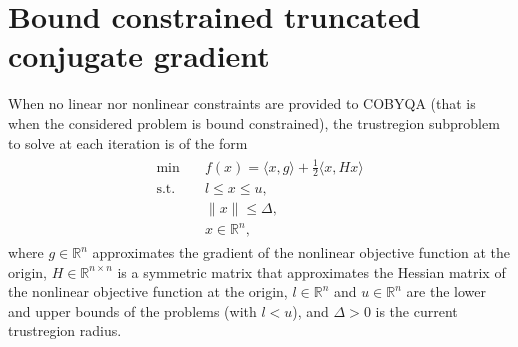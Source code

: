 \documentclass[letterpaper,10pt,english]{sphinxmanual}
\newcommand{\norm}[2][]{#1\lVert#2#1\rVert}
\newcommand{\inner}[2][]{#1\langle#2#1\rangle}
\def\R{\ensuremath{\mathds{R}}}
\begin{document}
\section{Bound constrained truncated conjugate gradient}
\label{\detokenize{algo/linalg.bvtcg:bound-constrained-truncated-conjugate-gradient}}\label{\detokenize{algo/linalg.bvtcg:linalg-bvtcg}}\label{\detokenize{algo/linalg.bvtcg::doc}}
\sphinxAtStartPar
When no linear nor nonlinear constraints are provided to COBYQA (that is when
the considered problem is bound constrained), the trust\sphinxhyphen{}region subproblem to
solve at each iteration is of the form
\begin{equation}\label{equation:algo/linalg.bvtcg:bvtcg}
\begin{split}\begin{array}{ll}
    \min        & \quad f(x) = \inner{x, g} + \frac{1}{2} \inner{x, H x}\\
    \text{s.t.} & \quad l \le x \le u,\\
                & \quad \norm{x} \le \Delta,\\
                & \quad x \in \R^n,
\end{array}\end{split}
\end{equation}
\sphinxAtStartPar
where \(g \in \R^n\) approximates the gradient of the nonlinear objective
function at the origin, \(H \in \R^{n \times n}\) is a symmetric matrix
that approximates the Hessian matrix of the nonlinear objective function at the
origin, \(l \in \R^n\) and \(u \in \R^n\) are the lower and upper
bounds of the problems (with \(l < u\)), and \(\Delta > 0\) is the
current trust\sphinxhyphen{}region radius.
\end{document}
